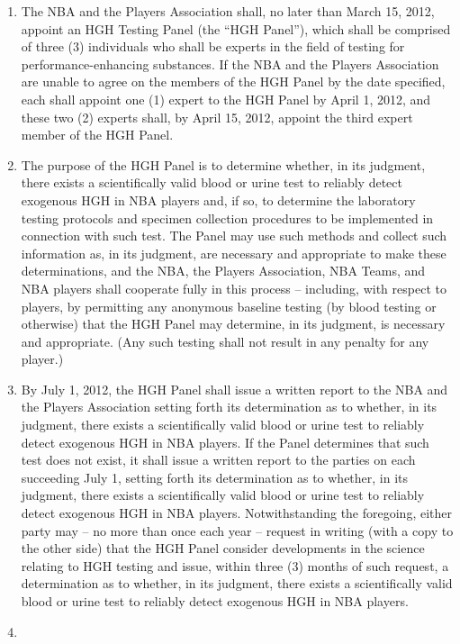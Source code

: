 \documentclass[
]{book}
\providecommand{\tightlist}{%
  \setlength{\itemsep}{0pt}\setlength{\parskip}{0pt}}
\begin{document}
\begin{enumerate}
\def\labelenumi{(\alph{enumi})}
\tightlist
\item
  The NBA and the Players Association shall, no later than March 15, 2012, appoint an HGH Testing Panel (the ``HGH Panel''), which shall be comprised of three (3) individuals who shall be experts in the field of testing for performance-enhancing substances. If the NBA and the Players Association are unable to agree on the members of the HGH Panel by the date specified, each shall appoint one (1) expert to the HGH Panel by April 1, 2012, and these two (2) experts shall, by April 15, 2012, appoint the third expert member of the HGH Panel.
\item
  The purpose of the HGH Panel is to determine whether, in its judgment, there exists a scientifically valid blood or urine test to reliably detect exogenous HGH in NBA players and, if so, to determine the laboratory testing protocols and specimen collection procedures to be implemented in connection with such test. The Panel may use such methods and collect such information as, in its judgment, are necessary and appropriate to make these determinations, and the NBA, the Players Association, NBA Teams, and NBA players shall cooperate fully in this process -- including, with respect to players, by permitting any anonymous baseline testing (by blood testing or otherwise) that the HGH Panel may determine, in its judgment, is necessary and appropriate. (Any such testing shall not result in any penalty for any player.)
\item
  By July 1, 2012, the HGH Panel shall issue a written report to the NBA and the Players Association setting forth its determination as to whether, in its judgment, there exists a scientifically valid blood or urine test to reliably detect exogenous HGH in NBA players. If the Panel determines that such test does not exist, it shall issue a written report to the parties on each succeeding July 1, setting forth its determination as to whether, in its judgment, there exists a scientifically valid blood or urine test to reliably detect exogenous HGH in NBA players. Notwithstanding the foregoing, either party may -- no more than once each year -- request in writing (with a copy to the other side) that the HGH Panel consider developments in the science relating to HGH testing and issue, within three (3) months of such request, a determination as to whether, in its judgment, there exists a scientifically valid blood or urine test to reliably detect exogenous HGH in NBA players.
\item

\end{enumerate}
\end{document}
